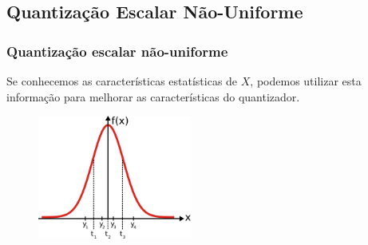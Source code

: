 \subsection{Quantização Escalar Não-Uniforme}

\begin{frame}[allowframebreaks]
   \frametitle{Quantização escalar não-uniforme}
 
  Se conhecemos as características estatísticas de $X$, podemos utilizar esta informação
  para melhorar as características do quantizador.

  \begin{figure}[h!]
  \centering
  \includegraphics[width=0.45\textwidth]{images/quantz-gaussian.pdf}
  \label{fig:quantz-gaussian}
  \end{figure}  
\end{frame}



